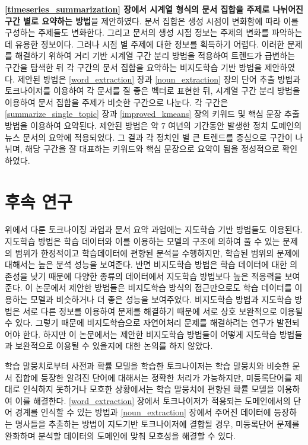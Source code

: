 \documentclass[oneside, ko,phd]{snuthesis_utf8_kor}
\begin{document}
\textbf{\ref{timeseries_summarization} 장에서 시계열 형식의 문서 집합을 주제로 나뉘어진 구간 별로 요약하는 방법}을 제안하였다.
문서 집합은 생성 시점이 변화함에 따라 이를 구성하는 주제들도 변화한다.
그리고 문서의 생성 시점 정보는 주제의 변화를 파악하는데 유용한 정보이다.
그러나 시점 별 주제에 대한 정보를 획득하기 어렵다.
이러한 문제를 해결하기 위하여 거리 기반 시계열 구간 분리 방법을 적용하여 트렌드가 급변하는 구간을 탐색한 뒤 각 구간의 문서 집합을 요약하는 비지도학습 기반 방법을 제안하였다.
제안된 방법은 \ref{word_extraction} 장과 \ref{noun_extraction} 장의 단어 추출 방법과 토크나이저를 이용하여 각 문서를 질 좋은 벡터로 표현한 뒤, 시계열 구간 분리 방법을 이용하여 문서 집합을 주제가 비슷한 구간으로 나눈다.
각 구간은 \ref{summarize_single_topic} 장과 \ref{improved_kmeans} 장의 키워드 및 핵심 문장 추출 방법을 이용하여 요약된다.
제안된 방법은 약 7 여년의 기간동안 발생한 정치 도메인의 뉴스 문서의 요약에 적용되었다.
그 결과 각 정치인 별 큰 트렌드를 중심으로 구간이 나뉘며, 해당 구간을 잘 대표하는 키워드와 핵심 문장으로 요약이 됨을 정성적으로 확인하였다.

\section{후속 연구}

위에서 다룬 토크나이징 과업과 문서 요약 과업에는 지도학습 기반 방법들도 이용된다.
지도학습 방법은 학습 데이터와 이를 이용하는 모델의 구조에 의하여 풀 수 있는 문제의 범위가 한정적이고 학습데이터에 편향된 분석을 수행하지만, 학습된 범위의 문제에 대해서는 높은 분석 성능을 보여준다.
반면 비지도학습 방법은 학습 데이터에 대한 의존성을 낮기 때문에 다양한 종류의 데이터에서 지도학습 방법보다 높은 적응력을 보여준다.
이 논문에서 제안한 방법들은 비지도학습 방식의 접근만으로도 학습 데이터를 이용하는 모델과 비슷하거나 더 좋은 성능을 보여주었다.
비지도학습 방법과 지도학습 방법은 서로 다른 정보를 이용하여 문제를 해결하기 때문에 서로 상호 보완적으로 이용될 수 있다.
그렇기 때문에 비지도학습으로 자연어처리 문제를 해결하려는 연구가 발전되어야 한다.
하지만 이 논문에서는 제안한 비지도학습 방법들이 어떻게 지도학습 방법들과 보완적으로 이용될 수 있을지에 대한 논의를 하지 않았다.

학습 말뭉치로부터 사전과 확률 모델을 학습한 토크나이저는 학습 말뭉치와 비슷한 문서 집합에 등장한 알려진 단어에 대해서는 정확한 처리가 가능하지만, 미등록단어를 제대로 인식하지 못하거나 모호한 상황에서는 학습 말뭉치에 편향된 확률 모델을 이용하여 이를 해결한다.
\ref{word_extraction} 장에서 토크나이저가 적용되는 도메인에서의 단어 경계를 인식할 수 있는 방법과 \ref{noun_extraction} 장에서 주어진 데이터에 등장하는 명사들을 추출하는 방법이 지도기반 토크나이저에 결합될 경우, 미등록단어 문제를 완화하며 분석할 데이터의 도메인에 맞춰 모호성을 해결할 수 있다.
\end{document}
